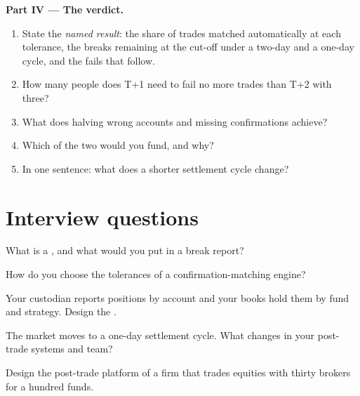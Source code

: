 \begin{problem}
\medskip\noindent\textbf{Part IV --- The verdict.}
\begin{enumerate}[resume]
\item State the \emph{named result}: the share of trades matched automatically at each tolerance, the breaks remaining at the 
cut-off under a two-day and a one-day cycle, and the fails that follow.
\item How many people does T+1 need to fail no more trades than T+2 with three?
\item What does halving wrong accounts and missing confirmations achieve?
\item Which of the two would you fund, and why?
\item In one sentence: what does a shorter settlement cycle change?
\end{enumerate}
\end{problem}

\section{Interview questions}

\begin{interviewq}\label{iq:pl:post-trade-systems:1}
What is a , and what would you put in a break report?
\end{interviewq}

\begin{interviewq}\label{iq:pl:post-trade-systems:2}
How do you choose the tolerances of a confirmation-matching engine?
\end{interviewq}

\begin{interviewq}\label{iq:pl:post-trade-systems:3}
Your custodian reports positions by account and your books hold them by fund and strategy. Design the .
\end{interviewq}

\begin{interviewq}\label{iq:pl:post-trade-systems:4}
The market moves to a one-day settlement cycle. What changes in your post-trade systems and team?
\end{interviewq}

\begin{interviewq}\label{iq:pl:post-trade-systems:5}
Design the post-trade platform of a firm that trades equities with thirty brokers for a hundred funds.
\end{interviewq}
